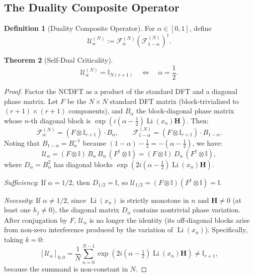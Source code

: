 \documentclass[12pt,a4paper]{amsart}
\theoremstyle{plain}
\newtheorem{theorem}{Theorem}[section]
\theoremstyle{definition}
\newtheorem{definition}[theorem]{Definition}
\theoremstyle{remark}
\begin{document}
\subsection{The Duality Composite Operator}

\begin{definition}[Duality Composite Operator]
For $\alpha \in [0,1]$, define
\[
\mathcal{U}_\alpha^{(N)} := \mathcal{F}_\alpha^{(N)} (\mathcal{F}_{1-\alpha}^{(N)})^\dagger.
\]
\end{definition}

\begin{theorem}[Self-Dual Criticality]\label{thm:selfdual}
\[
\mathcal{U}_\alpha^{(N)} = \mathbb{I}_{N(r+1)} \quad \Leftrightarrow \quad \alpha = \frac{1}{2}.
\]
\end{theorem}

\begin{proof}
Factor the NCDFT as a product of the standard DFT and a diagonal phase matrix. Let $F$ be the $N\times N$ standard DFT matrix (block-trivialized to $(r+1)\times(r+1)$ components), and $B_\alpha$ the block-diagonal phase matrix whose $n$-th diagonal block is $\exp(i(\alpha-\frac12)\operatorname{Li}(x_n)\mathbf{H})$. Then:
\[
\mathcal{F}_\alpha^{(N)} = (F\otimes\mathbb{I}_{r+1})\cdot B_\alpha,\qquad \mathcal{F}_{1-\alpha}^{(N)} = (F\otimes\mathbb{I}_{r+1})\cdot B_{1-\alpha}.
\]
Noting that $B_{1-\alpha}=B_\alpha^{-1}$ because $(1-\alpha)-\frac12=-(\alpha-\frac12)$, we have:
\[
\mathcal{U}_\alpha = (F\otimes\mathbb{I})\,B_\alpha\,B_\alpha\,(F^\dagger\otimes\mathbb{I}) = (F\otimes\mathbb{I})\,D_\alpha\,(F^\dagger\otimes\mathbb{I}),
\]
where $D_\alpha=B_\alpha^2$ has diagonal blocks $\exp(2i(\alpha-\frac12)\operatorname{Li}(x_n)\mathbf{H})$.

\textit{Sufficiency}: If $\alpha=1/2$, then $D_{1/2}=\mathbb{I}$, so $\mathcal{U}_{1/2}=(F\otimes\mathbb{I})(F^\dagger\otimes\mathbb{I})=\mathbb{I}$.

\textit{Necessity}: If $\alpha\neq 1/2$, since $\operatorname{Li}(x_n)$ is strictly monotone in $n$ and $\mathbf{H}\neq 0$ (at least one $h_j\neq 0$), the diagonal matrix $D_\alpha$ contains nontrivial phase variation. After conjugation by $F$, $\mathcal{U}_\alpha$ is no longer the identity (its off-diagonal blocks arise from non-zero interference produced by the variation of $\operatorname{Li}(x_n)$). Specifically, taking $k=0$:
\[
[\mathcal{U}_\alpha]_{0,0}=\frac{1}{N}\sum_{n=0}^{N-1}\exp(2i(\alpha-\tfrac12)\operatorname{Li}(x_n)\mathbf{H})\neq\mathbb{I}_{r+1},
\]
because the summand is non-constant in $N$.
\end{proof}
\end{document}
